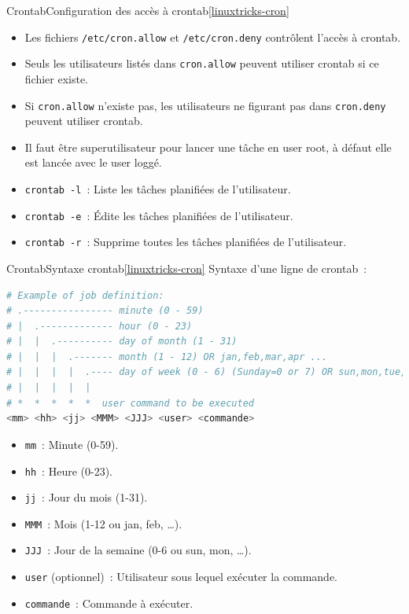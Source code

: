 \documentclass{beamer}
\begin{document}
    \begin{frame}{Crontab}{Configuration des accès à crontab\cref{linuxtricks-cron}}
        \begin{itemize}
            \item Les fichiers \lstinline{/etc/cron.allow} et \lstinline{/etc/cron.deny} contrôlent l'accès à crontab.
            \item Seuls les utilisateurs listés dans \lstinline{cron.allow} peuvent utiliser crontab si ce fichier existe.
            \item Si \lstinline{cron.allow} n'existe pas, les utilisateurs ne figurant pas dans \lstinline{cron.deny} peuvent utiliser crontab.
            \item Il faut être superutilisateur pour lancer une tâche en user root, à défaut elle est lancée avec le user loggé.
            \item \lstinline{crontab -l}~: Liste les tâches planifiées de l'utilisateur.
            \item \lstinline{crontab -e}~: Édite les tâches planifiées de l'utilisateur.
            \item \lstinline{crontab -r}~: Supprime toutes les tâches planifiées de l'utilisateur.
        \end{itemize}
    \end{frame}

    \begin{frame}[fragile]{Crontab}{Syntaxe crontab\cref{linuxtricks-cron}}
        Syntaxe d'une ligne de crontab~:
        \begin{lstlisting}[language=bash]
# Example of job definition:
# .---------------- minute (0 - 59)
# |  .------------- hour (0 - 23)
# |  |  .---------- day of month (1 - 31)
# |  |  |  .------- month (1 - 12) OR jan,feb,mar,apr ...
# |  |  |  |  .---- day of week (0 - 6) (Sunday=0 or 7) OR sun,mon,tue,wed,thu,fri,sat
# |  |  |  |  |
# *  *  *  *  *  user command to be executed
<mm> <hh> <jj> <MMM> <JJJ> <user> <commande>
        \end{lstlisting}
        \begin{itemize}
            \item \lstinline{mm}~: Minute (0-59).
            \item \lstinline{hh}~: Heure (0-23).
            \item \lstinline{jj}~: Jour du mois (1-31).
            \item \lstinline{MMM}~: Mois (1-12 ou jan, feb, \ldots).
            \item \lstinline{JJJ}~: Jour de la semaine (0-6 ou sun, mon, \ldots).
            \item \lstinline{user} (optionnel)~: Utilisateur sous lequel exécuter la commande.
            \item \lstinline{commande}~: Commande à exécuter.
        \end{itemize}
    \end{frame}
\end{document}
